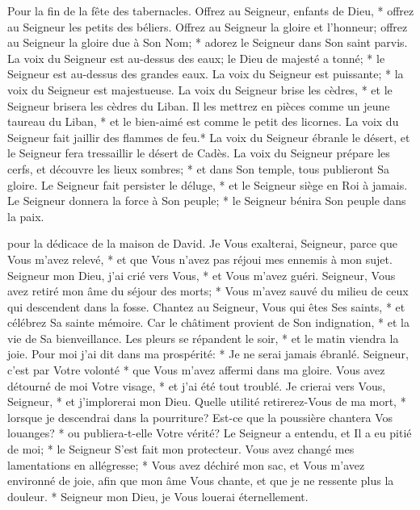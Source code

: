 Pour la fin de la fête des tabernacles. Offrez au Seigneur, enfants de Dieu, * offrez au Seigneur les petits des béliers.
Offrez au Seigneur la gloire et l'honneur; offrez au Seigneur la gloire due à Son Nom; * adorez le Seigneur dans Son saint parvis.
La voix du Seigneur est au-dessus des eaux; le Dieu de majesté a tonné; * le Seigneur est au-dessus des grandes eaux.
La voix du Seigneur est puissante; * la voix du Seigneur est majestueuse.
La voix du Seigneur brise les cèdres, * et le Seigneur brisera les cèdres du Liban.
Il les mettrez en pièces comme un jeune taureau du Liban, * et le bien-aimé est comme le petit des licornes.
La voix du Seigneur fait jaillir des flammes de feu.*
La voix du Seigneur ébranle le désert, et le Seigneur fera tressaillir le désert de Cadès.
La voix du Seigneur prépare les cerfs, et découvre les lieux sombres; * et dans Son temple, tous publieront Sa gloire.
Le Seigneur fait persister le déluge, * et le Seigneur siège en Roi à jamais.
Le Seigneur donnera la force à Son peuple; * le Seigneur bénira Son peuple dans la paix.

pour la dédicace de la maison de David.
Je Vous exalterai, Seigneur, parce que Vous m'avez relevé, * et que Vous n'avez pas réjoui mes ennemis à mon sujet.
Seigneur mon Dieu, j'ai crié vers Vous, * et Vous m'avez guéri.
Seigneur, Vous avez retiré mon âme du séjour des morts; * Vous m'avez sauvé du milieu de ceux qui descendent dans la fosse.
Chantez au Seigneur, Vous qui êtes Ses saints, * et célébrez Sa sainte mémoire.
Car le châtiment provient de Son indignation, * et la vie de Sa bienveillance. Les pleurs se répandent le soir, * et le matin viendra la joie.
Pour moi j'ai dit dans ma prospérité: * Je ne serai jamais ébranlé.
Seigneur, c'est par Votre volonté * que Vous m'avez affermi dans ma gloire. Vous avez détourné de moi Votre visage, * et j'ai été tout troublé.
Je crierai vers Vous, Seigneur, * et j'implorerai mon Dieu.
Quelle utilité retirerez-Vous de ma mort, * lorsque je descendrai dans la pourriture? Est-ce que la poussière chantera Vos louanges? * ou publiera-t-elle Votre vérité?
Le Seigneur a entendu, et Il a eu pitié de moi; * le Seigneur S'est fait mon protecteur.
Vous avez changé mes lamentations en allégresse; * Vous avez déchiré mon sac, et Vous m'avez environné de joie,
afin que mon âme Vous chante, et que je ne ressente plus la douleur. * Seigneur mon Dieu, je Vous louerai éternellement.

